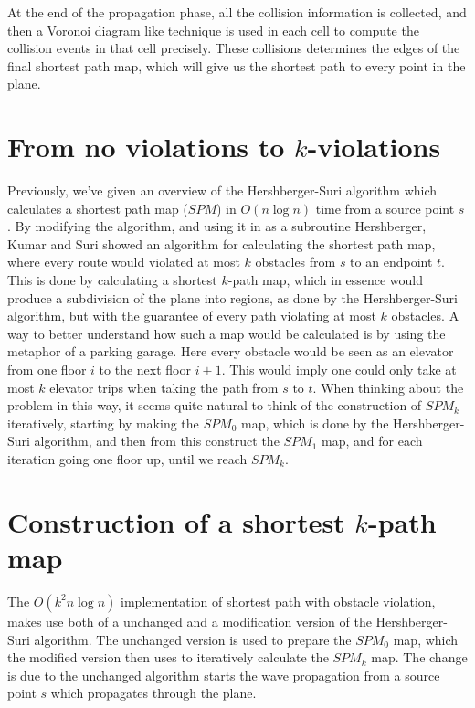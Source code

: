 At the end of the propagation phase, all the collision information is collected, and 
then a Voronoi diagram like technique is used in each cell to compute the collision 
events in that cell precisely. These collisions determines the edges of the final 
shortest path map, which will give us the shortest path to every point in the plane.

\section{From no violations to $k$-violations}

Previously, we've given an overview of the Hershberger-Suri algorithm which calculates a 
shortest path map ($SPM$) in $O(n\log n)$ time from a source point $s$ 
\cite{HershbergerS99}. By modifying the algorithm, and using it in as a subroutine 
Hershberger, Kumar and Suri showed an algorithm for calculating the shortest path map, 
where every route would violated at most $k$ obstacles from $s$ to an endpoint 
$t$\cite{HershbergerKS17}. This  is done by calculating a shortest $k$-path map, which in 
essence would produce a subdivision of the plane into regions, as done by the 
Hershberger-Suri algorithm, but with the guarantee of every path violating at most $k$ 
obstacles. A way to better understand how such a map would be calculated is by using the 
metaphor of a parking garage. Here every obstacle would be seen as an elevator from one 
floor $i$ to the next floor $i+1$. This would imply one could only take at most $k$ 
elevator trips when taking the path from $s$ to $t$. When thinking about the problem in 
this way, it seems quite natural to think of the construction of $SPM_k$ iteratively, 
starting by making the $SPM_0$ map, which is done by the Hershberger-Suri algorithm, and 
then from this construct the $SPM_1$ map, and for each iteration going one floor up, 
until we reach $SPM_{k}$.

\section{Construction of a shortest $k$-path map}

The $O(k^2 n \log n)$ implementation of shortest path with obstacle violation, makes use 
both of a unchanged and a modification version of the Hershberger-Suri algorithm. The 
unchanged version is used to prepare the $SPM_0$ map, which the modified version then 
uses to iteratively calculate the $SPM_k$ map. The change is due to the unchanged 
algorithm starts the wave propagation from a source point $s$ which propagates through 
the plane. 

